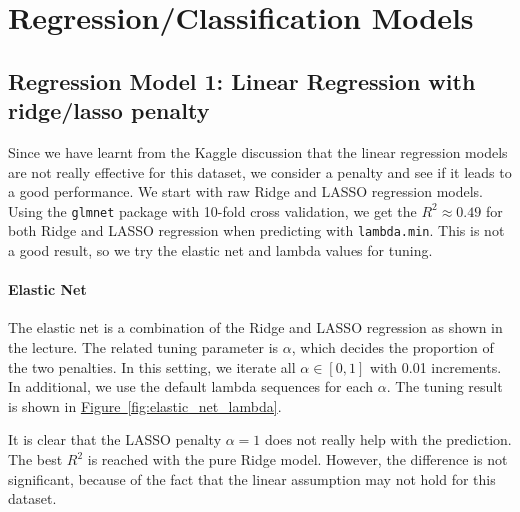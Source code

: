 \documentclass[8pt]{report}
\begin{document}
\section{Regression/Classification Models}

\subsection{Regression Model 1: Linear Regression with ridge/lasso penalty}
Since we have learnt from the Kaggle discussion that the linear regression models are not really effective for this dataset, 
we consider a penalty and see if it leads to a good performance. 
We start with raw Ridge and LASSO regression models. Using the \texttt{glmnet} package with 10-fold cross validation, 
we get the $R^2 \approx 0.49$ for both Ridge and LASSO regression when predicting with \texttt{lambda.min}. 
This is not a good result, so we try the elastic net and lambda values for tuning. 
\paragraph{Elastic Net}
The elastic net is a combination of the Ridge and LASSO regression as shown in the lecture. 
The related tuning parameter is $\alpha$, which decides the proportion of the two penalties. 
In this setting, we iterate all $\alpha \in [0, 1]$ with 0.01 increments. 
In additional, we use the default lambda sequences for each $\alpha$. 
The tuning result is shown in \hyperref[fig:elastic_net_lambda]{Figure~\ref*{fig:elastic_net_lambda}}.

It is clear that the LASSO penalty $\alpha = 1$ does not really help with the prediction.
The best $R^2$ is reached with the pure Ridge model. However, the difference is not significant, 
because of the fact that the linear assumption may not hold for this dataset.
\end{document}

